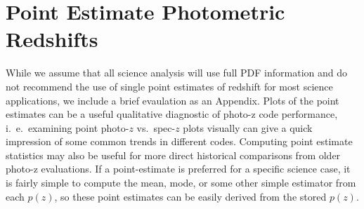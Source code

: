 \appendix

\section{Point Estimate Photometric Redshifts}
\label{sec:pointmetrics}
While we assume that all science analysis will use full PDF information and do not recommend the use of single point estimates of redshift for most science applications, we include a brief evaulation as an Appendix.  Plots of the point estimates can be a useful qualitative diagnostic of photo-z code performance, i.~e.~examining point photo-$z$ vs.~spec-$z$ plots visually can give a quick impression of some common trends in different codes.  Computing point estimate statistics may also be useful for more direct historical comparisons from older photo-z evaluations.  If a point-estimate is preferred for a specific science case, it is fairly simple to compute the mean, mode, or some other simple estimator from each $p(z)$, so these point estimates can be easily derived from the stored $p(z)$.


